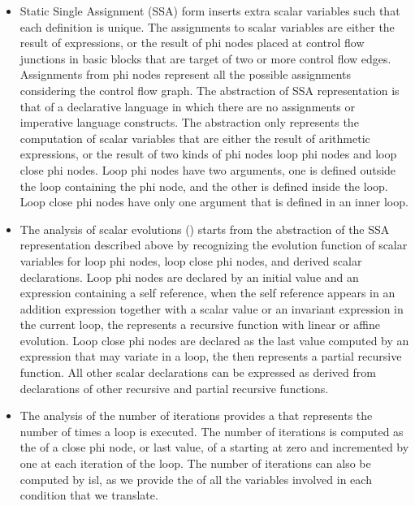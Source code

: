\documentclass{sig-alternate}
\begin{document}
\begin{itemize}
\item Static Single Assignment (SSA) form \cite{cytron} inserts extra scalar
  variables such that each definition is unique.  The assignments to scalar
  variables are either the result of expressions, or the result of phi nodes
  placed at control flow junctions in basic blocks that are target of two or
  more control flow edges.  Assignments from phi nodes represent all the
  possible assignments considering the control flow graph. The abstraction of
  SSA representation is that of a declarative language \cite{spop2007} in which
  there are no assignments or imperative language constructs.  The abstraction
  only represents the computation of scalar variables that are either the result
  of arithmetic expressions, or the result of two kinds of phi nodes loop phi
  nodes and loop close phi nodes. Loop phi nodes have two arguments, one is
  defined outside the loop containing the phi node, and the other is defined
  inside the loop.  Loop close phi nodes have only one argument that is defined
  in an inner loop.

\item The analysis of scalar evolutions (\scev{}) \cite{scev} starts from the
  abstraction of the SSA representation described above by recognizing the
  evolution function of scalar variables for loop phi nodes, loop close phi
  nodes, and derived scalar declarations.  Loop phi nodes are declared by an
  initial value and an expression containing a self reference, when the self
  reference appears in an addition expression together with a scalar value or an
  invariant expression in the current loop, the \scev{} represents a recursive
  function with linear or affine evolution.  Loop close phi nodes are declared
  as the last value computed by an expression that may variate in a loop, the
  \scev{} then represents a partial recursive function.  All other scalar
  declarations can be expressed as  derived from declarations of other
  recursive and partial recursive functions.

\item The analysis of the number of iterations \cite{scev} provides a \scev{} that
  represents the number of times a loop is executed.  The number of iterations
  is computed as the \scev{} of a close phi node, or last value, of a \scev{} starting
  at zero and incremented by one at each iteration of the loop.  The number of
  iterations can also be computed by isl, as we provide the  of all the
  variables involved in each condition that we translate.


\end{itemize}
\end{document}
